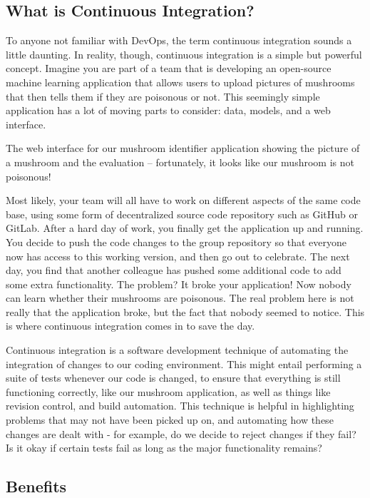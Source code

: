 {{{{\subsection{What is Continuous Integration?}

    To anyone not familiar with DevOps, the term continuous integration sounds a little daunting. In reality, though, continuous integration is a simple but powerful concept. Imagine you are part of a team that is developing an open-source machine learning application that allows users to upload pictures of mushrooms that then tells them if they are poisonous or not. This seemingly simple application has a lot of moving parts to consider: data, models, and a web interface.
    
    
    The web interface for our mushroom identifier application showing the picture of a mushroom and the evaluation – fortunately, it looks like our mushroom is not poisonous!
    
    Most likely, your team will all have to work on different aspects of the same code base, using some form of decentralized source code repository such as GitHub or GitLab. After a hard day of work, you finally get the application up and running. You decide to push the code changes to the group repository so that everyone now has access to this working version, and then go out to celebrate. The next day, you find that another colleague has pushed some additional code to add some extra functionality. The problem? It broke your application! Now nobody can learn whether their mushrooms are poisonous. The real problem here is not really that the application broke, but the fact that nobody seemed to notice. This is where continuous integration comes in to save the day.
    
    Continuous integration is a software development technique of automating the integration of changes to our coding environment. This might entail performing a suite of tests whenever our code is changed, to ensure that everything is still functioning correctly, like our mushroom application, as well as things like revision control, and build automation. This technique is helpful in highlighting problems that may not have been picked up on, and automating how these changes are dealt with - for example, do we decide to reject changes if they fail? Is it okay if certain tests fail as long as the major functionality remains?
    
\subsection{Benefits}

}}}}
